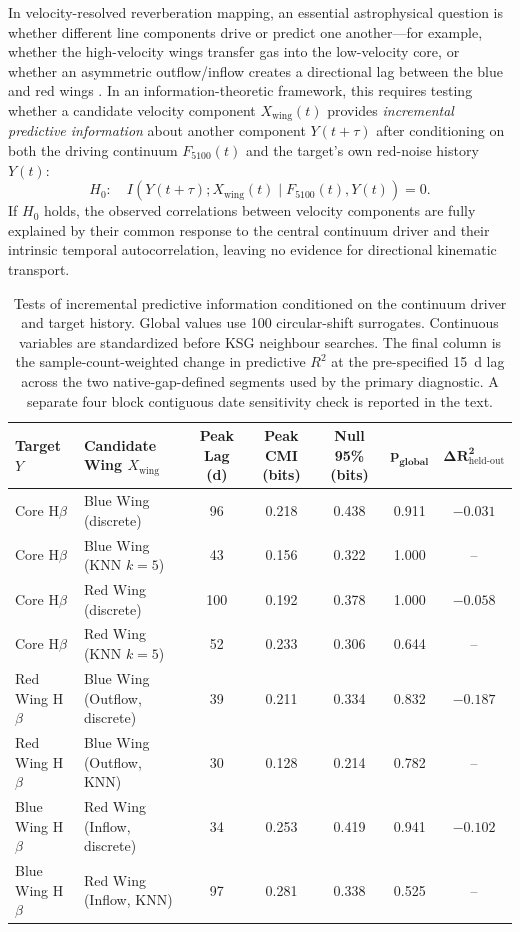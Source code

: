 \documentclass[fleqn,usenatbib]{mnras}
\begin{document}
In velocity-resolved reverberation mapping, an essential astrophysical question is whether different line components drive or predict one another---for example, whether the high-velocity wings transfer gas into the low-velocity core, or whether an asymmetric outflow/inflow creates a directional lag between the blue and red wings \citep{Xi2025}. In an information-theoretic framework, this requires testing whether a candidate velocity component $X_{\mathrm{wing}}(t)$ provides \textit{incremental predictive information} about another component $Y(t+\tau)$ after conditioning on both the driving continuum $F_{5100}(t)$ and the target's own red-noise history $Y(t)$:
\begin{equation}
H_0: \quad I(Y(t+\tau); X_{\mathrm{wing}}(t) \mid F_{5100}(t), Y(t)) = 0.
\end{equation}
If $H_0$ holds, the observed correlations between velocity components are fully explained by their common response to the central continuum driver and their intrinsic temporal autocorrelation, leaving no evidence for directional kinematic transport.

\begin{table}
\centering
\begin{tabular}{llccccc}
\hline
\textbf{Target} $Y$ & \textbf{Candidate Wing} $X_{\mathrm{wing}}$ & \textbf{Peak Lag (d)} & \textbf{Peak CMI (bits)} & \textbf{Null 95\% (bits)} & $\boldsymbol{p}_{\mathbf{global}}$ & $\boldsymbol{\Delta R^2_{\mathrm{held\text{-}out}}}$ \\
\hline
Core H\(\beta\)     & Blue Wing (discrete)   & 96 & 0.218 & 0.438 & 0.911 & $-0.031$ \\
Core H\(\beta\)     & Blue Wing (KNN $k=5$)   & 43 & 0.156 & 0.322 & 1.000 & -- \\
Core H\(\beta\)     & Red Wing (discrete)    & 100 & 0.192 & 0.378 & 1.000 & $-0.058$ \\
Core H\(\beta\)     & Red Wing (KNN $k=5$)    & 52 & 0.233 & 0.306 & 0.644 & -- \\
Red Wing H\(\beta\)  & Blue Wing (Outflow, discrete) & 39 & 0.211 & 0.334 & 0.832 & $-0.187$ \\
Red Wing H\(\beta\)  & Blue Wing (Outflow, KNN)      & 30 & 0.128 & 0.214 & 0.782 & -- \\
Blue Wing H\(\beta\) & Red Wing (Inflow, discrete)  & 34 & 0.253 & 0.419 & 0.941 & $-0.102$ \\
Blue Wing H\(\beta\) & Red Wing (Inflow, KNN)       & 97 & 0.281 & 0.338 & 0.525 & -- \\
\hline
\end{tabular}
\caption{Tests of incremental predictive information conditioned on the continuum driver and target history. Global values use 100 circular-shift surrogates. Continuous variables are standardized before KSG neighbour searches. The final column is the sample-count-weighted change in predictive $R^2$ at the pre-specified 15~d lag across the two native-gap-defined segments used by the primary diagnostic. A separate four block contiguous date sensitivity check is reported in the text.}
\label{tab:incremental_information}
\end{table}
\end{document}
